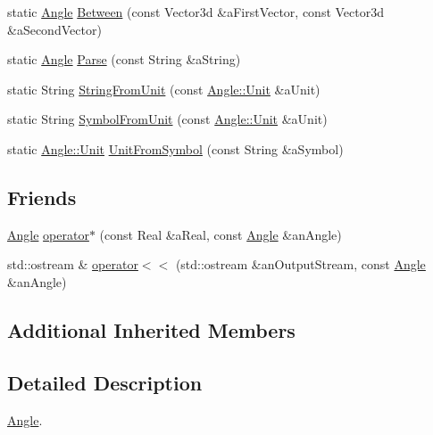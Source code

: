 \begin{DoxyCompactItemize}
\item 
static \hyperlink{classostk_1_1physics_1_1units_1_1_angle}{Angle} \hyperlink{classostk_1_1physics_1_1units_1_1_angle_a7795cc65081205ece71c45b846729ad5}{Between} (const Vector3d \&a\+First\+Vector, const Vector3d \&a\+Second\+Vector)
\item 
static \hyperlink{classostk_1_1physics_1_1units_1_1_angle}{Angle} \hyperlink{classostk_1_1physics_1_1units_1_1_angle_a13d4a4ef4fc8c44f9f3aaf6c191a9451}{Parse} (const String \&a\+String)
\item 
static String \hyperlink{classostk_1_1physics_1_1units_1_1_angle_ad4b96eb55989dd56a8b730157d51c220}{String\+From\+Unit} (const \hyperlink{classostk_1_1physics_1_1units_1_1_angle_aea1f8018b1d378b9dee56959d8eb9def}{Angle\+::\+Unit} \&a\+Unit)
\item 
static String \hyperlink{classostk_1_1physics_1_1units_1_1_angle_a8368ccc4f26856471d22134d9a6fb0d2}{Symbol\+From\+Unit} (const \hyperlink{classostk_1_1physics_1_1units_1_1_angle_aea1f8018b1d378b9dee56959d8eb9def}{Angle\+::\+Unit} \&a\+Unit)
\item 
static \hyperlink{classostk_1_1physics_1_1units_1_1_angle_aea1f8018b1d378b9dee56959d8eb9def}{Angle\+::\+Unit} \hyperlink{classostk_1_1physics_1_1units_1_1_angle_a754e7c95f024bc77fa69c58b0d02fd87}{Unit\+From\+Symbol} (const String \&a\+Symbol)
\end{DoxyCompactItemize}
\subsection*{Friends}
\begin{DoxyCompactItemize}
\item 
\hyperlink{classostk_1_1physics_1_1units_1_1_angle}{Angle} \hyperlink{classostk_1_1physics_1_1units_1_1_angle_af699984b24759466957ecddaa7e61fc9}{operator$\ast$} (const Real \&a\+Real, const \hyperlink{classostk_1_1physics_1_1units_1_1_angle}{Angle} \&an\+Angle)
\item 
std\+::ostream \& \hyperlink{classostk_1_1physics_1_1units_1_1_angle_a0846b77ee3281e8a559197c3c3208eed}{operator$<$$<$} (std\+::ostream \&an\+Output\+Stream, const \hyperlink{classostk_1_1physics_1_1units_1_1_angle}{Angle} \&an\+Angle)
\end{DoxyCompactItemize}
\subsection*{Additional Inherited Members}


\subsection{Detailed Description}
\hyperlink{classostk_1_1physics_1_1units_1_1_angle}{Angle}. 

